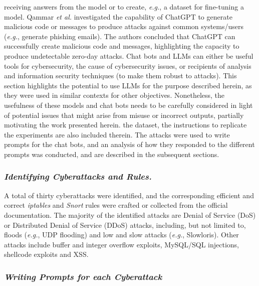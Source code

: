 \documentclass[sigconf]{acmart}
\begin{document}
receiving answers from the model or to create, {\itshape e.g.}, a dataset for
fine-tuning a model. Qammar {\itshape et al.} \cite{Qammar23} investigated the capability
of ChatGPT to generate malicious code or messages to produce
attacks against common systems/users ({\itshape e.g.}, generate phishing emails). The authors concluded that ChatGPT can successfully create
malicious code and messages, highlighting the capacity to produce
undetectable zero-day attacks.
Chat bots and LLMs can either be useful tools for cybersecurity,
the cause of cybersecurity issues, or recipients of analysis and
information security techniques (to make them robust to attacks).
This section highlights the potential to use LLMs for the purpose
described herein, as they were used in similar contexts for other
objectives. Nonetheless, the usefulness of these models and chat
bots needs to be carefully considered in light of potential issues that
might arise from misuse or incorrect outputs, partially motivating
the work presented herein.
the dataset, the instructions to replicate the experiments are also
included therein. The attacks were used to write prompts for the
chat bots, and an analysis of how they responded to the different prompts was conducted, and are described in the subsequent
sections.

\subsubsection{{\itshape  Identifying Cyberattacks and Rules.}}
A total of thirty cyberattacks were identified, and the corresponding efficient and correct
{\itshape iptables} and {\itshape Snort} rules were crafted or collected from the official
documentation. The majority of the identified attacks are Denial
of Service (DoS) or Distributed Denial of Service (DDoS) attacks,
including, but not limited to, floods ({\itshape e.g.}, UDP flooding) and low
and slow attacks ({\itshape e.g.}, Slowloris). Other attacks include buffer and
integer overflow exploits, MySQL/SQL injections, shellcode exploits
and XSS.

\subsubsection{{\itshape Writing Prompts for each Cyberattack}}
\end{document}
